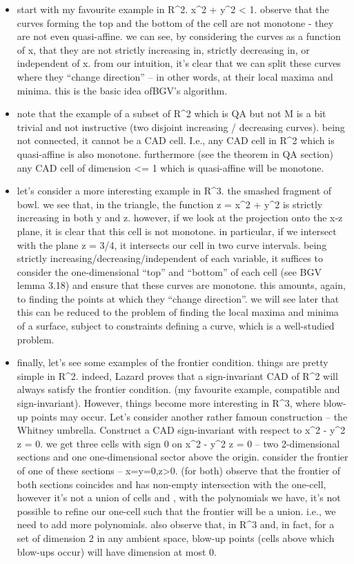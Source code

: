 \documentclass[
]{book}
\providecommand{\tightlist}{%
  \setlength{\itemsep}{0pt}\setlength{\parskip}{0pt}}
\theoremstyle{definition}
\theoremstyle{definition}
\theoremstyle{definition}
\theoremstyle{definition}
\theoremstyle{remark}
\begin{document}
\begin{itemize}
\begin{itemize}
    \begin{itemize}
    \tightlist
    \item
      start with my favourite example in R\^{}2. x\^{}2 + y\^{}2 \textless{} 1. observe that the curves forming the top and the bottom of the cell are not monotone - they are not even quasi-affine. we can see, by considering the curves as a function of x, that they are not strictly increasing in, strictly decreasing in, or independent of x. from our intuition, it's clear that we can split these curves where they ``change direction'' -- in other words, at their local maxima and minima. this is the basic idea ofBGV's algorithm.
    \item
      note that the example of a subset of R\^{}2 which is QA but not M is a bit trivial and not instructive (two disjoint increasing / decreasing curves). being not connected, it cannot be a CAD cell. I.e., any CAD cell in R\^{}2 which is quasi-affine is also monotone. furthermore (see the theorem in QA section) any CAD cell of dimension \textless= 1 which is quasi-affine will be monotone.
    \item
      let's consider a more interesting example in R\^{}3. the smashed fragment of bowl. we see that, in the triangle, the function z = x\^{}2 + y\^{}2 is strictly increasing in both y and z. however, if we look at the projection onto the x-z plane, it is clear that this cell is not monotone. in particular, if we intersect with the plane z = 3/4, it intersects our cell in two curve intervals. being strictly increasing/decreasing/independent of each variable, it suffices to consider the one-dimensional ``top'' and ``bottom'' of each cell (see BGV lemma 3.18) and ensure that these curves are monotone. this amounts, again, to finding the points at which they ``change direction''. we will see later that this can be reduced to the problem of finding the local maxima and minima of a surface, subject to constraints defining a curve, which is a well-studied problem.
    \item
      finally, let's see some examples of the frontier condition. things are pretty simple in R\^{}2. indeed, Lazard proves that a sign-invariant CAD of R\^{}2 will always satisfy the frontier condition. (my favourite example, compatible and sign-invariant). However, things become more interesting in R\^{}3, where blow-up points may occur. Let's consider another rather famoun construction -- the Whitney umbrella. Construct a CAD sign-invariant with respect to x\^{}2 - y\^{}2 z = 0. we get three cells with sign 0 on x\^{}2 - y\^{}2 z = 0 -- two 2-dimensional sections and one one-dimensional sector above the origin. consider the frontier of one of these sections -- x=y=0,z\textgreater0. (for both) observe that the frontier of both sections coincides and has non-empty intersection with the one-cell, however it's not a union of cells and , with the polynomials we have, it's not possible to refine our one-cell such that the frontier will be a union. i.e., we need to add more polynomials. also observe that, in R\^{}3 and, in fact, for a set of dimension 2 in any ambient space, blow-up points (cells above which blow-ups occur) will have dimension at most 0.

\end{itemize}
\end{itemize}
\end{itemize}
\end{document}
